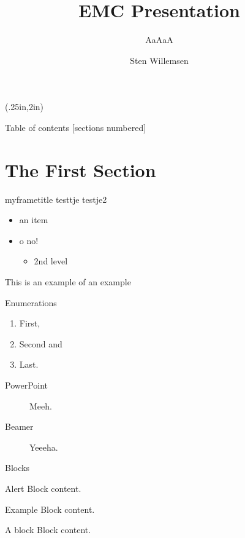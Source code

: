 \documentclass[12pt, dutch]{beamer}
\author{Sten Willemsen}
\title{EMC Presentation}
\subtitle{AaAaA}
\begin{document}
\begin{frame}
	\titlepage
\begin{textblock*}{\textwidth}(.25in,2in)
\end{textblock*} 
\end{frame}


\begin{frame}{Table of contents}
  [sections numbered]
  \tableofcontents[hideallsubsections]
\end{frame}

\section{The First Section}

\begin{frame}{myframetitle}
testtje
testje2
\begin{itemize}
\item an item
\item o \alert{no}!
\begin{itemize}
\item 2nd level
\end{itemize}
\end{itemize}
\begin{example}[An example]
This is an example of an example
\end{example}
\end{frame}

\begin{frame}{Enumerations}
      \begin{enumerate}
        \item First, \item Second and \item Last.
      \end{enumerate}
       \begin{description}
        \item[PowerPoint] Meeh. \item[Beamer] Yeeeha.
      \end{description}
\end{frame}

\begin{frame}{Blocks}
    \begin{alertblock}{Alert}
        Block content.
      \end{alertblock}
      \begin{exampleblock}{Example}
        Block content.
       \end{exampleblock} 
      \begin{block}{A block}
        Block content.
       \end{block} 
           
\end{frame}
\end{document}

